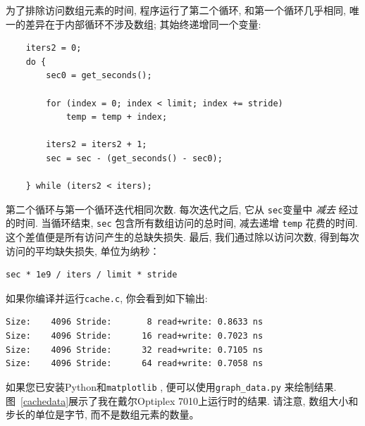 \documentclass[12pt]{book}
\begin{document}
{%
为了排除访问数组元素的时间, 程序运行了第二个循环, 和第一个循环几乎相同, 唯一的差异在于内部循环不涉及数组; 其始终递增同一个变量:

\begin{verbatim}
    iters2 = 0;
    do {
        sec0 = get_seconds();
        
        for (index = 0; index < limit; index += stride) 
            temp = temp + index;
        
        iters2 = iters2 + 1;
        sec = sec - (get_seconds() - sec0);

    } while (iters2 < iters);
\end{verbatim}

第二个循环与第一个循环迭代相同次数. 
每次迭代之后, 它从 {\tt sec}变量中 {\em 减去} 经过的时间. 
当循环结束, {\tt sec} 包含所有数组访问的总时间, 减去递增 {\tt temp} 
花费的时间. 这个差值便是所有访问产生的总缺失损失. 
最后, 我们通过除以访问次数, 得到每次访问的平均缺失损失, 单位为纳秒：


\begin{verbatim}
sec * 1e9 / iters / limit * stride
\end{verbatim}

如果你编译并运行{\tt cache.c}, 你会看到如下输出:

\begin{verbatim}
Size:    4096 Stride:       8 read+write: 0.8633 ns
Size:    4096 Stride:      16 read+write: 0.7023 ns
Size:    4096 Stride:      32 read+write: 0.7105 ns
Size:    4096 Stride:      64 read+write: 0.7058 ns
\end{verbatim}

如果您已安装Python和{\tt matplotlib} , 便可以使用\verb"graph_data.py"
来绘制结果. 图~\ref{cachedata}展示了我在戴尔Optiplex 7010上运行时的结果.
请注意, 数组大小和步长的单位是字节, 而不是数组元素的数量。

}
\end{document}
